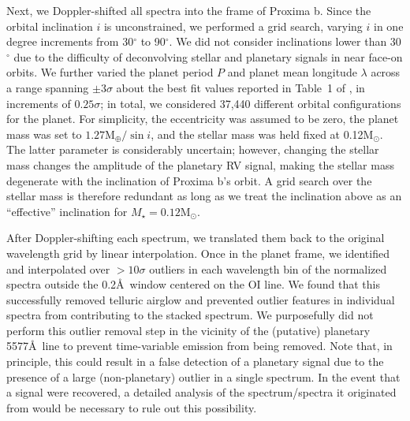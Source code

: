 \documentclass{emulateapj}
\begin{document}
Next, we Doppler-shifted all spectra into the frame of Proxima b. Since the orbital inclination $i$ is unconstrained, we performed a grid search, varying $i$ in one degree increments from 30$^\circ$ to 90$^\circ$. We did not consider inclinations lower than 30$^\circ$ due to the difficulty of deconvolving stellar and planetary signals in near face-on orbits. We further varied the planet period $P$ and planet mean longitude $\lambda$ across a range spanning $\pm 3\sigma$ about the best fit values reported in Table~1 of \citet{Anglada-Escude2016}, in increments of $0.25\sigma$; in total, we considered 37,440 different orbital configurations for the planet. For simplicity, the eccentricity was assumed to be zero, the planet mass was set to $1.27\mathrm{M_\oplus}/\sin i$, and the stellar mass was held fixed at 0.12$\mathrm{M_\odot}$. The latter parameter is considerably uncertain; however, changing the stellar mass changes the amplitude of the planetary RV signal, making the stellar mass degenerate with the inclination of Proxima b's orbit. A grid search over the stellar mass is therefore redundant as long as we treat the inclination above as an ``effective'' inclination for $M_\star = 0.12\mathrm{M_\odot}$.

After Doppler-shifting each spectrum, we translated them back to the original wavelength grid by linear interpolation. Once in the planet frame, we identified and interpolated over $> 10 \sigma$ outliers in each wavelength bin of the normalized spectra outside the 0.2\AA\ window centered on the OI line. We found that this successfully removed telluric airglow and prevented outlier features in individual spectra from contributing to the stacked spectrum. We purposefully did not perform this outlier removal step in the vicinity of the (putative) planetary 5577\AA\ line to prevent time-variable emission from being removed. Note that, in principle, this could result in a false detection of a planetary signal due to the presence of a large (non-planetary) outlier in a single spectrum. In the event that a signal were recovered, a detailed analysis of the spectrum/spectra it originated from would be necessary to rule out this possibility.

\end{document}
